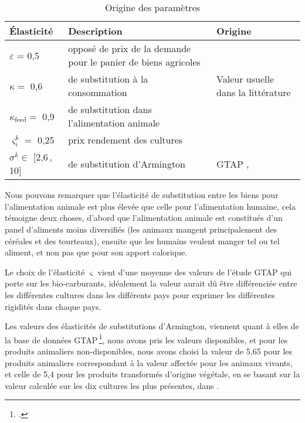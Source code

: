 \begin{table}[h]
    \centering
    \begin{tabularx}{\textwidth}{l >{\raggedright\arraybackslash}X >{\raggedright\arraybackslash}X}
        \textbf{Élasticité}        & \textbf{Description}                                           & \textbf{Origine}                                   \\ \hline
        $\varepsilon$ = 0,5        & opposé de prix de la demande pour le panier de biens agricoles & \cite{Comin2021}                                   \\
        $\kappa =$ 0,6             & de substitution à la consommation                              & Valeur usuelle dans la littérature \cite{Rude2000} \\
        $\kappa_\text{feed} =$ 0,9 & de substitution dans l'alimentation animale                    & \cite{Rude2000}                                    \\
        $\varsigma_i^k =$ 0,25     & prix rendement des cultures                                    & \cite{Keeney2009}                                  \\
        $\sigma^k \in$ [2,6\,, 10] & de substitution d'Armington                                    & GTAP  \cite{Aguiar2022}, \cite{Costinot2016}       \\
        \hline
    \end{tabularx}
    \caption{Origine des paramètres}
    \label{tab:ela}
\end{table}

Nous pouvons remarquer que l'élasticité de substitution entre les biens pour l'alimentation animale est plus élevée que celle pour l'alimentation humaine, cela témoigne deux choses, d'abord que l'alimentation animale est constitués d'un panel d'aliments moins diversifiés (les animaux mangent principalement des céréales et des tourteaux), ensuite que les humains veulent manger tel ou tel aliment, et non pas que pour son apport calorique.

Le choix de l'élasticité $\varsigma$ vient d'une moyenne des valeurs de l'étude GTAP \cite{Miller2009} qui porte sur les bio-carburants, idéalement la valeur aurait dû être différenciée entre les différentes cultures dans les différents pays pour exprimer les différentes rigidités dans chaque pays.

Les valeurs des élasticités de substitutions d'Armington, viennent quant à elles de la base de données GTAP\,\footcite{Aguiar2022}, nous avons pris les valeurs disponibles, et pour les produits animaliers non-disponibles, nous avons choisi la valeur de 5,65 pour les produits animaliers correspondant à la valeur affectée pour les animaux vivants, et celle de 5,4 pour les produits transformés d'origine végétale, en se basant sur la valeur calculée sur les dix cultures les plus présentes, dans \cite{Costinot2016}.
